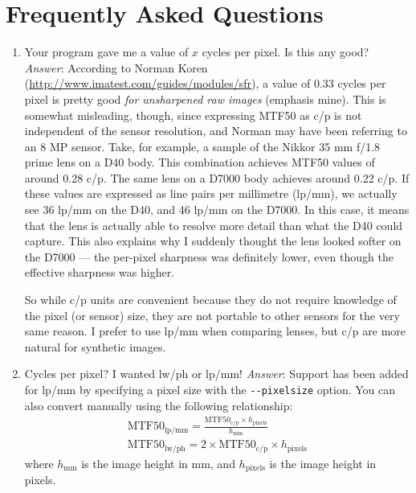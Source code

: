 \documentclass[a4paper]{article}
\begin{document}
\section{Frequently Asked Questions}
\begin{enumerate}
  \item Your program gave me a value of $x$ cycles per pixel. Is this any
good? \emph{Answer}: According to Norman Koren
(\url{http://www.imatest.com/guides/modules/sfr}), a value of 0.33 cycles
per pixel is pretty good \emph{for unsharpened raw images} (emphasis mine).
This is somewhat misleading, though, since expressing MTF50 as c/p is not
independent of the sensor resolution, and Norman may have been referring to
an 8 MP sensor. Take, for example, a sample of the
Nikkor 35 mm f/1.8 prime lens on a D40 body. This combination achieves MTF50
values of around 0.28 c/p. The same lens on a D7000 body achieves around
0.22 c/p. If these values are expressed as line pairs per millimetre
(lp/mm), we actually see 36 lp/mm on the D40, and 46 lp/mm on the D7000. In
this case, it means that the lens is actually able to resolve more detail
than what the D40 could capture. This also explains why I suddenly thought
the lens looked softer on the D7000 --- the per-pixel sharpness was
definitely lower, even though the effective sharpness was higher.

So while c/p units are convenient because they do not require knowledge of the
pixel (or sensor) size, they are not portable to other sensors for the very
same reason. 
I prefer to use lp/mm when comparing lenses, but c/p are more natural for
synthetic images. 
  \item Cycles per pixel? I wanted lw/ph or lp/mm! \emph{Answer}: Support
has been added for lp/mm by specifying a pixel size with the
\verb+--pixelsize+ option.
You can also convert manually using the
following relationship:
    \begin{eqnarray}
	\mathrm{MTF50}_{\mathrm{lp/mm}} = 
	  \frac{\mathrm{MTF50}_{\mathrm{c/p}} \times h_{\mathrm{pixels}}}{h_{\mathrm{mm}}} \\
        \mathrm{MTF50}_{\mathrm{lw/ph}} = 2 \times \mathrm{MTF50}_{\mathrm{c/p}} \times h_{\mathrm{pixels}} 
    \end{eqnarray}
where $h_{\mathrm{mm}}$ is the image height in mm, and $h_{\mathrm{pixels}}$
is the image height in pixels.
\end{enumerate}
\end{document}
